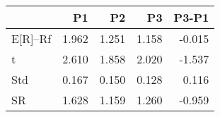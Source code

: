\begin{tabular}{lrrrr}
\toprule
 & P1 & P2 & P3 & P3-P1 \\
\midrule
E[R]--Rf & 1.962 & 1.251 & 1.158 & -0.015 \\
t & 2.610 & 1.858 & 2.020 & -1.537 \\
Std & 0.167 & 0.150 & 0.128 & 0.116 \\
SR & 1.628 & 1.159 & 1.260 & -0.959 \\
\bottomrule
\end{tabular}
